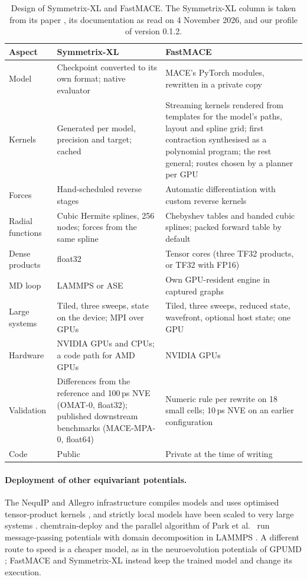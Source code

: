 \documentclass[11pt]{article}
\begin{document}
\begin{table}[t]
\centering
\small
\renewcommand{\arraystretch}{1.15}
\begin{tabularx}{\textwidth}{>{\raggedright\arraybackslash}p{2.5cm}YY}
\toprule
Aspect & Symmetrix-XL & FastMACE \\
\midrule
Model & Checkpoint converted to its own format; native evaluator & MACE's PyTorch modules, rewritten in a private copy \\
Kernels & Generated per model, precision and target; cached & Streaming kernels rendered from templates for the model's paths, layout and spline grid; first contraction synthesised as a polynomial program; the rest general; routes chosen by a planner per GPU \\
Forces & Hand-scheduled reverse stages & Automatic differentiation with custom reverse kernels \\
Radial functions & Cubic Hermite splines, 256 nodes; forces from the same spline & Chebyshev tables and banded cubic splines; packed forward table by default \\
Dense products & float32 & Tensor cores (three TF32 products, or TF32 with FP16) \\
MD loop & LAMMPS or ASE & Own GPU-resident engine in captured graphs \\
Large systems & Tiled, three sweeps, state on the device; MPI over GPUs & Tiled, three sweeps, reduced state, wavefront, optional host state; one GPU \\
Hardware & NVIDIA GPUs and CPUs; a code path for AMD GPUs & NVIDIA GPUs \\
Validation & Differences from the reference and 100\,ps NVE (OMAT-0, float32); published downstream benchmarks (MACE-MPA-0, float64) & Numeric rule per rewrite on 18 small cells; 10\,ps NVE on an earlier configuration \\
Code & Public & Private at the time of writing \\
\bottomrule
\end{tabularx}
\caption{Design of Symmetrix-XL and FastMACE. The Symmetrix-XL column is taken from its paper
\cite{fu2026symmetrixxl}, its documentation as read on 4 November 2026, and our profile of version 0.1.2.}
\label{tab:design}
\end{table}

\paragraph{Deployment of other equivariant potentials.}
The NequIP and Allegro infrastructure compiles models and uses optimised tensor-product kernels
\cite{tan2026nequip,kavanagh2026fast}, and strictly local models have been scaled to very large systems
\cite{musaelian2023scaling}. chemtrain-deploy \cite{fuchs2025chemtraindeploy} and the parallel algorithm of Park
et al.\ \cite{park2024scalable} run message-passing potentials with domain decomposition in LAMMPS
\cite{thompson2022lammps,johansson2025lammpskokkos}. A different route to speed is a cheaper model, as in the
neuroevolution potentials of GPUMD \cite{fan2022gpumd}; FastMACE and Symmetrix-XL instead keep the trained model
and change its execution.
\end{document}
